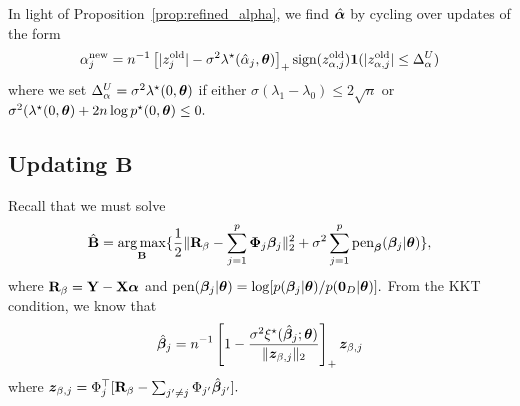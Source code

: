 In light of Proposition~\ref{prop:refined_alpha}, we find $\hat{\boldsymbol{\alpha}}$ by cycling over updates of the form
\begin{equation}
\label{eq:refined_alpha_update}
\alpha^{\text{new}}_{j} = n^{-1}\left[ \lvert z^{\text{old}}_{j} \rvert - \sigma^{2}\lambda^{\star}(\hat{\alpha}_{j}, \boldsymbol{\theta}) \right]_{+}\text{sign}(z^{\text{old}}_{\alpha,j})\mathbf{1}(\lvert z^{\text{old}}_{\alpha,j}\rvert \leq \Delta^{U}_{\alpha})
\end{equation}
where we set $\Delta^{U}_{\alpha} = \sigma^{2}\lambda^{\star}(0, \boldsymbol{\theta})$ if either $\sigma(\lambda_{1} - \lambda_{0}) \leq 2\sqrt{n}$ or $\sigma^{2}(\lambda^{\star}(0,\boldsymbol{\theta}) + 2n\log{p^{\star}(0,\boldsymbol{\theta})} \leq 0.$


\subsection{Updating $\mathbf{B}$}
 
Recall that we must solve
$$
\hat{\mathbf{B}} = \operatorname*{arg\,max}_{\mathbf{B}}\{\frac{1}{2}\lVert \mathbf{R}_{\beta} - \sum_{j = 1}^{p}{\boldsymbol{\Phi}_{j}\boldsymbol{\beta}_{j}} \rVert_{2}^{2} + \sigma^{2}\sum_{j = 1}^{p}{\text{pen}_{\boldsymbol{\beta}}(\boldsymbol{\beta}_{j} \vert \boldsymbol{\theta})} \},
$$
where $\mathbf{R}_{\beta} = \mathbf{Y} - \mathbf{X} \boldsymbol{\alpha}$ and $\text{pen}(\boldsymbol{\beta}_{j} \vert \boldsymbol{\theta}) = \log[p(\boldsymbol{\beta}_{j} \vert \boldsymbol{\theta})/p(\mathbf{0}_{D}\lvert \boldsymbol{\theta})].$
From the KKT condition, we know that 
$$
\hat{\boldsymbol{\beta}}_{j} = n^{-1}\left[1 - \frac{\sigma^{2}\xi^{\star}(\hat{\boldsymbol{\beta}}_{j}; \boldsymbol{\theta})}{\lVert \bm{z}_{\beta,j} \rVert_{2}}\right]_{+}\bm{z}_{\beta,j}
$$
where $\bm{z}_{\beta,j} = \Phi_{j}^{\top}[\mathbf{R}_{\beta} - \sum_{j' \neq j}{\Phi_{j'}\hat{\boldsymbol{\beta}}_{j'}}].$

